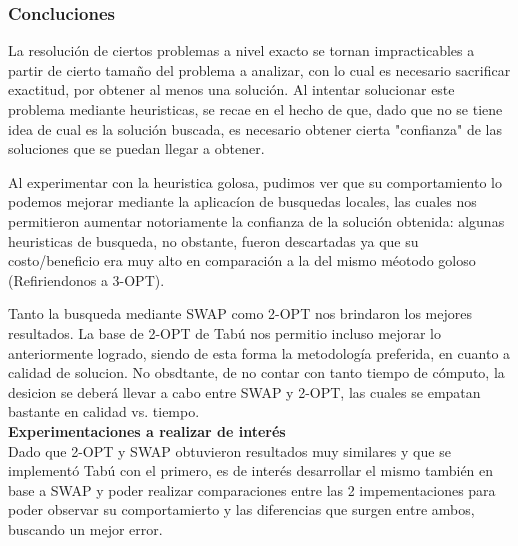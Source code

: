 \subsubsection{Concluciones}

La resolución de ciertos problemas a nivel exacto se tornan impracticables a partir de cierto tamaño del problema a analizar, con lo cual es necesario sacrificar exactitud, por obtener al menos una solución. Al intentar solucionar este problema mediante heuristicas, se recae en el hecho de que, dado que no se tiene idea de cual es la solución buscada, es necesario obtener cierta "confianza" de las soluciones que se puedan llegar a obtener.

Al experimentar con la heuristica golosa, pudimos ver que su comportamiento lo podemos mejorar mediante la aplicacíon de busquedas locales, las cuales nos permitieron aumentar notoriamente la confianza de la solución obtenida: algunas heuristicas de busqueda, no obstante, fueron descartadas ya que  su costo/beneficio era muy alto en comparación a la del mismo méotodo goloso (Refiriendonos a 3-OPT). 

Tanto la busqueda mediante SWAP como 2-OPT nos brindaron los mejores resultados. La base de 2-OPT de Tabú nos permitio incluso mejorar lo anteriormente logrado, siendo de esta forma la metodología preferida, en cuanto a calidad de solucion. No obsdtante, de no contar con tanto tiempo de cómputo, la desicion se deberá llevar a cabo entre SWAP y 2-OPT, las cuales se empatan bastante en calidad vs. tiempo.\\

\textbf{Experimentaciones a realizar de interés}\\
Dado que 2-OPT y SWAP obtuvieron resultados muy similares y que se implementó Tabú con el primero, es de interés desarrollar el mismo también en base a SWAP y poder realizar comparaciones entre las 2 impementaciones para poder observar su comportamierto y las diferencias que surgen entre ambos, buscando un mejor error.

